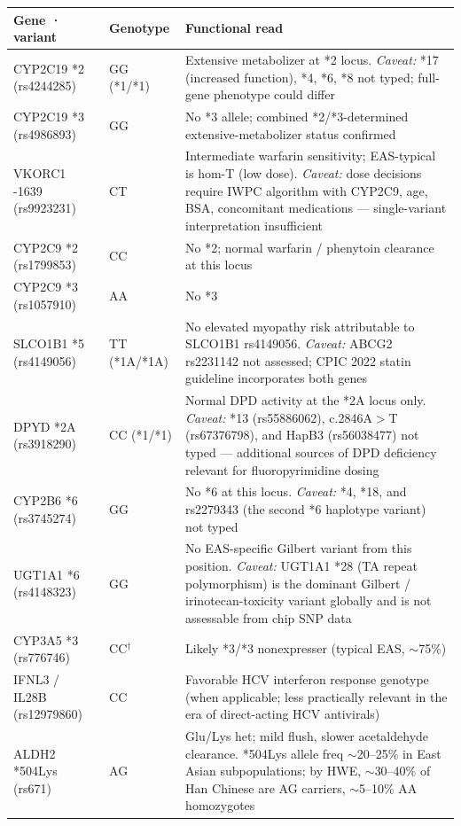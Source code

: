 \documentclass[11pt,a4paper]{article}
\begin{document}
\begin{center}
\small
\begin{tabular}{p{}p{}p{}}
\toprule
Gene · variant & Genotype & Functional read \\
\midrule
CYP2C19 *2 (rs4244285) & GG (*1/*1) & Extensive metabolizer at *2 locus. \emph{Caveat:} *17 (increased function), *4, *6, *8 not typed; full-gene phenotype could differ \\
CYP2C19 *3 (rs4986893) & GG          & No *3 allele; combined *2/*3-determined extensive-metabolizer status confirmed \\
VKORC1 -1639 (rs9923231) & CT        & Intermediate warfarin sensitivity; EAS-typical is hom-T (low dose). \emph{Caveat:} dose decisions require IWPC algorithm with CYP2C9, age, BSA, concomitant medications --- single-variant interpretation insufficient \\
CYP2C9 *2 (rs1799853) & CC           & No *2; normal warfarin / phenytoin clearance at this locus \\
CYP2C9 *3 (rs1057910) & AA           & No *3 \\
SLCO1B1 *5 (rs4149056) & TT (*1A/*1A) & No elevated myopathy risk attributable to SLCO1B1 rs4149056. \emph{Caveat:} ABCG2 rs2231142 not assessed; CPIC 2022 statin guideline incorporates both genes \\
DPYD *2A (rs3918290) & CC (*1/*1)    & Normal DPD activity at the *2A locus only. \emph{Caveat:} *13 (rs55886062), c.2846A$>$T (rs67376798), and HapB3 (rs56038477) not typed --- additional sources of DPD deficiency relevant for fluoropyrimidine dosing \\
CYP2B6 *6 (rs3745274) & GG           & No *6 at this locus. \emph{Caveat:} *4, *18, and rs2279343 (the second *6 haplotype variant) not typed \\
UGT1A1 *6 (rs4148323) & GG           & No EAS-specific Gilbert variant from this position. \emph{Caveat:} UGT1A1 *28 (TA repeat polymorphism) is the dominant Gilbert / irinotecan-toxicity variant globally and is not assessable from chip SNP data \\
CYP3A5 *3 (rs776746)   & CC$^{\dagger}$ & Likely *3/*3 nonexpresser (typical EAS, $\sim$75\%) \\
IFNL3 / IL28B (rs12979860) & CC      & Favorable HCV interferon response genotype (when applicable; less practically relevant in the era of direct-acting HCV antivirals) \\
ALDH2 *504Lys (rs671) & AG           & Glu/Lys het; mild flush, slower acetaldehyde clearance. *504Lys allele freq $\sim$20--25\% in East Asian subpopulations; by HWE, $\sim$30--40\% of Han Chinese are AG carriers, $\sim$5--10\% AA homozygotes \\

\end{tabular}
\end{center}
\end{document}
